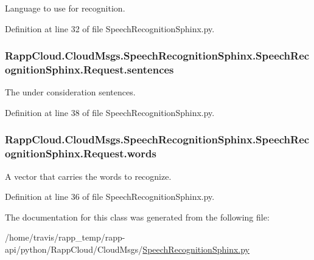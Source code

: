 Language to use for recognition. 



Definition at line 32 of file Speech\-Recognition\-Sphinx.\-py.

\hypertarget{classRappCloud_1_1CloudMsgs_1_1SpeechRecognitionSphinx_1_1SpeechRecognitionSphinx_1_1Request_aa24acc8a7cc67efde78f2ebebf2163e7}{
\subsubsection[{sentences}]{\setlength{\rightskip}{0pt plus 5cm}Rapp\-Cloud.\-Cloud\-Msgs.\-Speech\-Recognition\-Sphinx.\-Speech\-Recognition\-Sphinx.\-Request.\-sentences}}\label{classRappCloud_1_1CloudMsgs_1_1SpeechRecognitionSphinx_1_1SpeechRecognitionSphinx_1_1Request_aa24acc8a7cc67efde78f2ebebf2163e7}


The under consideration sentences. 



Definition at line 38 of file Speech\-Recognition\-Sphinx.\-py.

\hypertarget{classRappCloud_1_1CloudMsgs_1_1SpeechRecognitionSphinx_1_1SpeechRecognitionSphinx_1_1Request_a53b695c6df5781eadffdf0c633b48f91}{
\subsubsection[{words}]{\setlength{\rightskip}{0pt plus 5cm}Rapp\-Cloud.\-Cloud\-Msgs.\-Speech\-Recognition\-Sphinx.\-Speech\-Recognition\-Sphinx.\-Request.\-words}}\label{classRappCloud_1_1CloudMsgs_1_1SpeechRecognitionSphinx_1_1SpeechRecognitionSphinx_1_1Request_a53b695c6df5781eadffdf0c633b48f91}


A vector that carries the words to recognize. 



Definition at line 36 of file Speech\-Recognition\-Sphinx.\-py.



The documentation for this class was generated from the following file\-:\begin{DoxyCompactItemize}
\item 
/home/travis/rapp\-\_\-temp/rapp-\/api/python/\-Rapp\-Cloud/\-Cloud\-Msgs/\hyperlink{SpeechRecognitionSphinx_8py}{Speech\-Recognition\-Sphinx.\-py}\end{DoxyCompactItemize}

